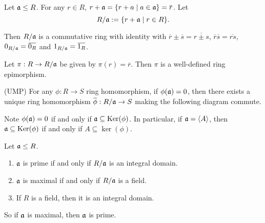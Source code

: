 \begin{construction}
    Let $\mathfrak{a} \leq R$. For any $r \in R$, $r+\ffa = \{r + a \mid a \in \ffa\} = \overbar r$. Let 
    \[R/\mathfrak{a} := \{r + \mathfrak{a} \mid r \in R\}.\] 
    \par Then $R/\mathfrak{a}$ is a commutative ring with identity with $\overbar r \pm \overbar s = \overbar {r \pm s}$, $\overbar r \overbar s = \overbar{rs}$, $0_{R/\ffa} = \overbar {0_R}$ and $1_{R/\ffa} = \overbar {1_R}$. \par
    Let $\pi: R \to R/\mathfrak{a}$ be given by $\pi(r) = \overbar r$. Then $\pi$ is a well-defined ring epimorphism. \par 
    (UMP) For any $\phi: R \to S$ ring homomorphism, if $\phi(\mathfrak{a}) = 0$, then there exists a unique ring homomorphism $\overbar \phi: R/\ffa \to S$ making the following diagram commute. 
    \begin{center} 
    \end{center}
    \par
    Note $\phi(\mathfrak{a}) = 0$ if and only if $\mathfrak{a} \subseteq \operatorname{Ker}(\phi)$. In particular, if $\mathfrak{a} = \langle A \rangle$, then $\mathfrak{a} \subseteq \operatorname{Ker}(\phi)$ if and only if $A \subseteq \ker(\phi)$.
\end{construction}

\begin{fact}
    Let $\mathfrak{a} \leq R$. 
    \begin{enumerate}
        \item $\mathfrak{a}$ is prime if and only if $R/\mathfrak{a}$ is an integral domain.
        \item $\mathfrak{a}$ is maximal if and only if $R/\mathfrak{a}$ is a field.
        \item If $R$ is a field, then it is an integral domain. 
    \end{enumerate}
    So if $\mathfrak{a}$ is maximal, then $\mathfrak{a}$ is prime.
\end{fact}


